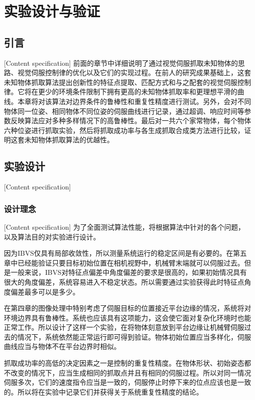 \documentclass[fontset=fandol,type=bachelor,campus=harbin,bsmainpagenumberline=true]{hithesisbook}
\begin{document}
\chapter{实验设计与验证}
\section{引言}[Content specification]
前面的章节中详细说明了通过视觉伺服抓取未知物体的思路、视觉伺服控制律的优化以及它们的实现过程。在前人的研究成果基础上，这套未知物体抓取算法提出创新性的特征点提取、匹配方式和与之配套的视觉伺服控制律。它将在更少的环境条件限制下拥有更高的未知物体抓取率和更理想平滑的曲线。本章将对该算法对边界条件的鲁棒性和重复性精度进行测试。另外，会对不同物体同一位姿、相同物体不同位姿的伺服曲线进行记录，通过超调、响应时间等参数反映算法应对多种多样情况下的高鲁棒性。最后对一共六个家常物体，每个物体六种位姿进行抓取实验，然后将抓取成功率与各生成抓取合成类方法进行比较，证明这套未知物体抓取算法的优越性。

\section{实验设计}[Content specification]
\subsection{设计理念}[Content specification]
为了全面测试算法性能，将根据算法中针对的各个问题，以及算法目的对实验进行设计。


因为IBVS仅具有局部收敛性，所以测量系统运行的稳定区间是有必要的。在第五章中已经能验证只要目标初始位置在相机视野中，机械臂末端就可以伺服过去。但是一般来说，IBVS对特征点偏差中角度偏差的要求是很高的，如果初始情况具有很大的角度偏差，系统容易进入不稳定状态。所以需要通过实验获得此时特征点角度偏差最多可以是多少。


在第四章的图像处理中特别考虑了伺服目标的位置接近平台边缘的情况，系统将对环境边界具有鲁棒性。系统也应该具有这项能力，这会使它面对复杂化环境时也能正常工作。所以设计了这样一个实验，在将物体刻意放到平台边缘让机械臂伺服过去的情况下，系统依然能正常运行即可得到验证。物体初始位置应当多样化，伺服曲线应当与物体不在平台边界时相似。


抓取成功率的高低的决定因素之一是控制的重复性精度。在物体形状、初始姿态都不改变的情况下，应当生成相同的抓取点并且有相同的伺服过程。所以对同一情况伺服多次，它们的速度指令应当是一致的，伺服停止时停下来的位点应该也是一致的。所以将在实验中记录它们并获得关于系统重复性精度的结论。
\end{document}
